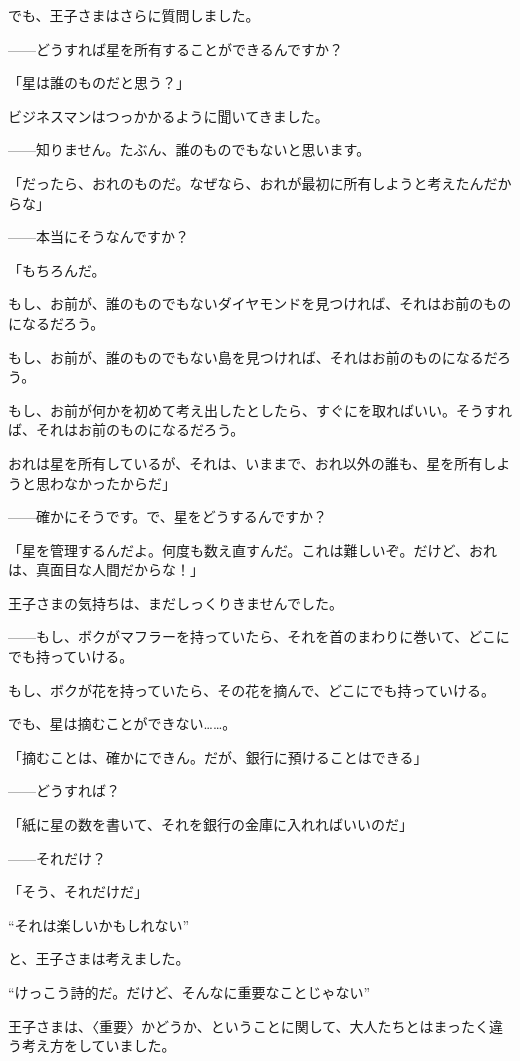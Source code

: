 でも、王子さまはさらに質問しました。


——どうすれば星を所有することができるんですか？

「星は誰のものだと思う？」

ビジネスマンはつっかかるように聞いてきました。

——知りません。たぶん、誰のものでもないと思います。

「だったら、おれのものだ。なぜなら、おれが最初に所有しようと考えたんだからな」

——本当にそうなんですか？

「もちろんだ。

もし、お前が、誰のものでもないダイヤモンドを見つければ、それはお前のものになるだろう。

もし、お前が、誰のものでもない島を見つければ、それはお前のものになるだろう。

もし、お前が何かを初めて考え出したとしたら、すぐにを取ればいい。そうすれば、それはお前のものになるだろう。

おれは星を所有しているが、それは、いままで、おれ以外の誰も、星を所有しようと思わなかったからだ」

——確かにそうです。で、星をどうするんですか？

「星を管理するんだよ。何度も数え直すんだ。これは難しいぞ。だけど、おれは、真面目な人間だからな！」

王子さまの気持ちは、まだしっくりきませんでした。

——もし、ボクがマフラーを持っていたら、それを首のまわりに巻いて、どこにでも持っていける。

もし、ボクが花を持っていたら、その花を摘んで、どこにでも持っていける。

でも、星は摘むことができない……。

「摘むことは、確かにできん。だが、銀行に預けることはできる」

——どうすれば？

「紙に星の数を書いて、それを銀行の金庫に入れればいいのだ」

——それだけ？

「そう、それだけだ」

“それは楽しいかもしれない”

と、王子さまは考えました。

“けっこう詩的だ。だけど、そんなに重要なことじゃない”

王子さまは、〈重要〉かどうか、ということに関して、大人たちとはまったく違う考え方をしていました。

